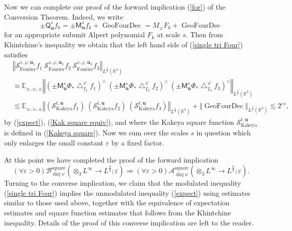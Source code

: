 \documentclass{amsart}%
\theoremstyle{plain}
\numberwithin{equation}{section}
\begin{document}
Now we can complete our proof of the forward implication (\ref{for}) of the
Conversion Theorem. Indeed, we write%
\[
\pm\mathsf{Q}_{\mathbf{u}}^{s}f_{k}=\pm\mathsf{M}_{\mathbf{u}}^{s}%
f_{k}+\operatorname*{GeoFourDec}=M_{\pm}F_{k}+\operatorname*{GeoFourDec}%
\]
for an appropriate subunit Alpert polynomial $F_{k}$ at scale $s$. Then from
Khintchine's inequality we obtain that the left hand side of
(\ref{single tri Four}) satisfies%
\begin{align*}
& \left\Vert \mathcal{S}_{\operatorname*{Fourier}}^{s,\varphi,\mathbf{u}_{1}%
}f_{1}\ \mathcal{S}_{\operatorname*{Fourier}}^{s,\varphi,\mathbf{u}_{2}}%
f_{2}\ \mathcal{S}_{\operatorname*{Fourier}}^{s,\varphi,\mathbf{u}_{3}}%
f_{3}\right\Vert _{L^{\frac{q}{3}}\left(  \mathbb{R}^{3}\right)  }\\
& \approx\mathbb{E}_{\pm,\pm,\pm}\left\Vert \left(  \pm\mathsf{M}_{\mathbf{u}%
}^{s}\Phi_{\ast}\bigtriangleup_{I_{1}}^{\varphi}f_{1}\right)  ^{\wedge
}\ \left(  \pm\mathsf{M}_{\mathbf{u}}^{s}\Phi_{\ast}\bigtriangleup_{I_{2}%
}^{\varphi}f_{2}\right)  ^{\wedge}\ \left(  \pm\mathsf{M}_{\mathbf{u}}^{s}%
\Phi_{\ast}\bigtriangleup_{I_{3}}^{\varphi}f_{3}\right)  ^{\wedge}\right\Vert
_{L^{\frac{q}{3}}\left(  \mathbb{R}^{3}\right)  }\\
& \lesssim\mathbb{E}_{\pm,\pm,\pm}\left\Vert \left(  \mathcal{S}%
_{\operatorname{Kakeya}}^{t,\mathbf{u}}f_{1}\right)  \ \left(  \mathcal{S}%
_{\operatorname{Kakeya}}^{t,\mathbf{u}}f_{2}\right)  \ \left(  \mathcal{S}%
_{\operatorname{Kakeya}}^{t,\mathbf{u}}f_{3}\right)  \right\Vert _{L^{\frac
{q}{3}}\left(  \mathbb{R}^{3}\right)  }+\left\Vert \operatorname*{GeoFourDec}%
\right\Vert _{L^{\frac{q}{3}}\left(  \mathbb{R}^{3}\right)  }\lesssim
2^{\varepsilon s},
\end{align*}
by (\ref{expect}), (\ref{Kak square equiv}), and where the Kakeya square
function $\mathcal{S}_{\operatorname{Kakeya}}^{t,\mathbf{u}}$ is defined in
(\ref{Kakeya square}). Now we sum over the scales $s$ in question which only
enlarges the small constant $\varepsilon$ by a fixed factor.

At this point we have completed the proof of the forward implication
\begin{equation}
\left(  \forall\varepsilon>0\right)  \mathcal{B}_{\operatorname*{disj}\nu
}^{\operatorname*{square}}\left(  \otimes_{3}L^{\infty}\rightarrow L^{\frac
{q}{3}};\varepsilon\right)  \Longrightarrow\left(  \forall\varepsilon
>0\right)  \mathcal{A}_{\operatorname*{disj}\nu}^{\operatorname*{square}%
}\left(  \otimes_{3}L^{\infty}\rightarrow L^{\frac{q}{3}};\varepsilon\right)
.\label{for}%
\end{equation}
Turning to the converse implication, we claim that the modulated inequality
(\ref{single tri Four}) implies the unmodulated inequality (\ref{expect})
using estimates similar to those used above, together with the equivalence of
expectation estimates and square function estimates that follows from the
Khintchine inequality. Details of the proof of this converse implication are
left to the reader.
\end{document}
